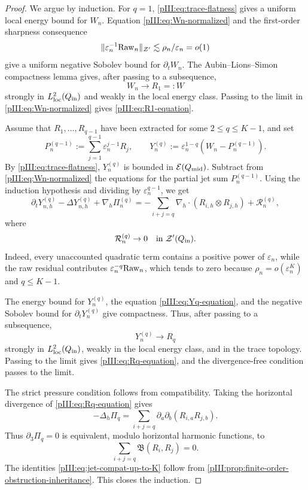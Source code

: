 \documentclass[11pt]{article}
\numberwithin{equation}{section}
\theoremstyle{plain}
\theoremstyle{definition}
\theoremstyle{remark}
\newcommand{\eps}{\varepsilon}
\newcommand{\nabh}{\nabla_h}
\newcommand{\calB}{\mathfrak B}
\newcommand{\calE}{\mathcal E}
\newcommand{\calR}{\mathcal R}
\newcommand{\calZ}{\mathcal Z}
\begin{document}
\begin{proof}
We argue by induction.  For \(q=1\), \eqref{pIII:eq:trace-flatness} gives a uniform local
energy bound for \(W_n\).  Equation \eqref{pIII:eq:Wn-normalized} and the first-order sharpness
consequence
\[
        \|\eps_n^{-1}{\rm Raw}_n\|_{\calZ'}
        \lesssim \rho_n/\eps_n=o(1)
\]
give a uniform negative Sobolev bound for \(\partial_tW_n\).  The Aubin--Lions--Simon
compactness lemma gives, after passing to a subsequence,
\[
        W_n\to R_1=:W
\]
strongly in \(L^2_{\rm loc}(Q_{\rm in})\) and weakly in the local energy class.  Passing to
the limit in \eqref{pIII:eq:Wn-normalized} gives \eqref{pIII:eq:R1-equation}.

Assume that \(R_1,\ldots,R_{q-1}\) have been extracted for some \(2\le q\le K-1\), and set
\[
        P^{(q-1)}_n
        :=
        \sum_{j=1}^{q-1}\eps_n^{j-1}R_j,
        \qquad
        Y^{(q)}_n
        :=
        \eps_n^{1-q}(W_n-P^{(q-1)}_n).
\]
By \eqref{pIII:eq:trace-flatness}, \(Y^{(q)}_n\) is bounded in \(\calE(Q_{\rm mid})\).
Subtract from \eqref{pIII:eq:Wn-normalized} the equations for the partial jet sum
\(P^{(q-1)}_n\).  Using the induction hypothesis and dividing by \(\eps_n^{q-1}\), we get
\begin{equation}\label{pIII:eq:Yq-equation}
        \partial_tY^{(q)}_{n,h}-\Delta Y^{(q)}_{n,h}
        +\nabh\Pi^{(q)}_n
        =
        -\sum_{i+j=q}\nabh\cdot(R_{i,h}\otimes R_{j,h})
        +\calR^{(q)}_n,
\end{equation}
where
\[
        \calR^{(q)}_n\to0
        \quad\text{in }\calZ'(Q_{\rm in}).
\]
Indeed, every unaccounted quadratic term contains a positive power of \(\eps_n\), while the
raw residual contributes \(\eps_n^{-q}{\rm Raw}_n\), which tends to zero because
\(\rho_n=o(\eps_n^K)\) and \(q\le K-1\).

The energy bound for \(Y^{(q)}_n\), the equation \eqref{pIII:eq:Yq-equation}, and the negative
Sobolev bound for \(\partial_tY^{(q)}_n\) give compactness.  Thus, after passing to a
subsequence,
\[
        Y^{(q)}_n\to R_q
\]
strongly in \(L^2_{\rm loc}(Q_{\rm in})\), weakly in the local energy class, and in the
trace topology.  Passing to the limit gives \eqref{pIII:eq:Rq-equation}, and the divergence-free
condition passes to the limit.

The strict pressure condition follows from compatibility.  Taking the horizontal divergence
of \eqref{pIII:eq:Rq-equation} gives
\[
        -\Delta_h\Pi_q
        =
        \sum_{i+j=q}\partial_a\partial_b(R_{i,a}R_{j,b}).
\]
Thus \(\partial_3\Pi_q=0\) is equivalent, modulo horizontal harmonic functions, to
\[
        \sum_{i+j=q}\calB(R_i,R_j)=0.
\]
The identities \eqref{pIII:eq:jet-compat-up-to-K} follow from
\cref{pIII:prop:finite-order-obstruction-inheritance}.  This closes the induction.
\end{proof}
\end{document}
